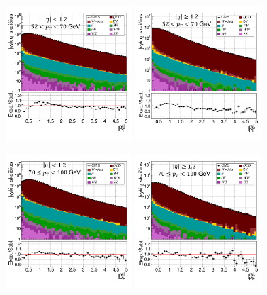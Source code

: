 \documentclass[a4paper, 12pt, oneside]{article}
\begin{document}
\begin{figure}[H]
	\includegraphics[width=0.42\textwidth]{Magistrinis/TFIT_ctrl_barrel_50to70.png}
	\includegraphics[width=0.42\textwidth]{Magistrinis/TFIT_ctrl_endcap_50to70.png}
\end{figure}
\vspace{-1cm}
\begin{figure}[H]
	\includegraphics[width=0.42\textwidth]{Magistrinis/TFIT_ctrl_barrel_70to100.png}
	\includegraphics[width=0.42\textwidth]{Magistrinis/TFIT_ctrl_endcap_70to100.png}
\end{figure}
\end{document}
